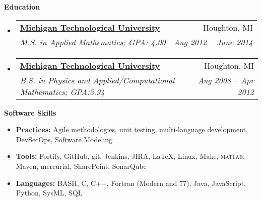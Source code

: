 \documentclass[letterpaper,11pt]{article}
\makeatletter
\newcommand{\resitem}[1]{\item #1 \vspace{-2pt}}
\newcommand{\resheading}[1]{{\large \textbf{#1}}}
\newcommand{\ressubheading}[4]{
\begin{tabular*}{6.5in}{l@{\extracolsep{\fill}}r}
		\textbf{#1} & #2 \\
		\textit{#3} & \textit{#4} \\
\end{tabular*}\vspace{-6pt}}
\makeatother
\begin{document}
\resheading{Education}
	\begin{itemize}
		\item
			\ressubheading{\href{www.mtu.edu}{Michigan Technological University}}{Houghton, MI}{M.S. in Applied Mathematics; GPA: 4.00}{Aug 2012 -- June 2014}
                                           \begin{comment}
				{ \footnotesize
				\begin{itemize}
					\resitem{Advisor: Dr. Jiguang Sun} 
				\end{itemize}
				}
                                          \end{comment}
		\item
			\ressubheading{\href{www.mtu.edu}{Michigan Technological University}}{Houghton, MI}{B.S. in Physics and Applied/Computational Mathematics; GPA:3.94}{Aug 2008 -- Apr 2012}
                                           \begin{comment}
				{ \footnotesize
				\begin{itemize}
					\resitem{Graduated Summa Cum Laude} 
				\end{itemize}
				}
                                          \end{comment}
\begin{comment}%
		\item
			\ressubheading{\href{http://www.isd12.org/chs/}{Centennial High School}}{Circle Pines, MN}{GPA:3.79}{Sep. 2003 - June 2008}
                                           \begin{comment}
				{ \footnotesize
				\begin{itemize}
				\resitem{Graduated with honors}
				\end{itemize}
				}
\end{comment}
	\end{itemize} %


\resheading{Software Skills}
\begin{itemize}
  \resitem{\textbf{Practices:} Agile methodologies, unit testing, multi-language development, DevSecOps, Software Modeling}
  \resitem{\textbf{Tools:} Fortify, GitHub, git, Jenkins, JIRA,  \LaTeX, Linux, Make, \textsc{matlab}, Maven, mercurial, SharePoint, SonarQube}
  \resitem{\textbf{Languages:} BASH, C, C++, Fortran (Modern and 77), Java, JavaScript, Python, SysML, SQL}
\end{itemize}
\end{document}

